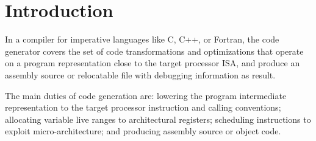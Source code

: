 \chapter{Introduction }

In a compiler for imperative languages like C, C++, or Fortran, the code
generator covers the set of code transformations and optimizations that operate
on a program representation close to the target processor ISA, and produce an
assembly source or relocatable file with debugging information as result.

The main duties of code generation are: lowering the program intermediate
representation to the target processor instruction and calling conventions;
allocating variable live ranges to architectural registers; scheduling
instructions to exploit micro-architecture; and producing assembly source or
object code.

